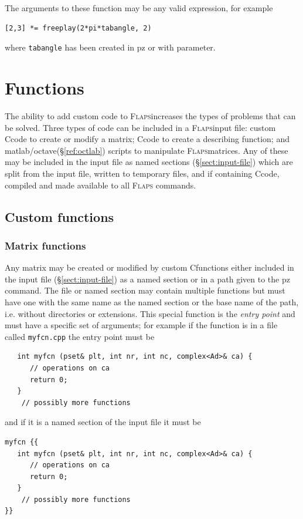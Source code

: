 \documentclass[11pt,openany,twoside]{book}
\numberwithin{equation}{section}		%
\def\Cpp{{C\nolinebreak[4]\hspace{-.05em}\raisebox{.4ex}{\tiny\bf ++}}\:}
\newcommand{\Cmd}[1]{{\sf #1}}
\newcommand{\Newterm}[1]{{\em #1}}
\newcommand{\Code}[1]{{\small\tt #1}}
\newcommand{\Flaps}{\textsc{Flaps\:}}
\newcommand{\Octlab}{\Cmd{matlab}/\Cmd{octave}\:}
\newcommand{\Sectref}[1]{\S\ref{#1}}
\begin{document}
The arguments to these function may be any valid expression, for example
\begin{lstlisting}
[2,3] *= freeplay(2*pi*tabangle, 2)
\end{lstlisting}
where \Code{tabangle} has been created in \Cmd{pz} or with \Cmd{parameter}.

\newpage
\chapter{Functions}\label{chap:functions}
The ability to add custom code to \Flaps increases the types
of problems that can be solved. Three types of code can be included
in a \Flaps input file: custom \Cpp code to create or modify a matrix;
\Cpp code to create a describing function; and \Octlab (\Sectref{ref:octlab})
scripts to manipulate \Flaps matrices.
Any of these may be included in the input file as named sections
(\Sectref{sect:input-file}) which
are split from the input file, written to temporary files, and
if containing \Cpp code, compiled and made available to all \Flaps
commands.

\section{Custom functions} 
\subsection{Matrix functions}
Any matrix may be created or modified by custom \Cpp functions either included
in the input file (\Sectref{sect:input-file}) as a named section 
or in a path given to the \Cmd{pz} command. The file or named section may contain
multiple functions but must have one with the same name as the named section
or the base name of the path, i.e. without directories or extensions. This
special function is the \Newterm{entry point} and must have a specific set
of arguments; for example if the function is in a file called \Code{myfcn.cpp}
the entry point must be
\begin{lstlisting}
   int myfcn (pset& plt, int nr, int nc, complex<Ad>& ca) {
      // operations on ca
      return 0;
   }
	// possibly more functions
\end{lstlisting}
and if it is a named section of the input file it must be
\begin{lstlisting}
myfcn {{
   int myfcn (pset& plt, int nr, int nc, complex<Ad>& ca) {
      // operations on ca
      return 0;
   }
	// possibly more functions
}}
\end{lstlisting}
\end{document}
